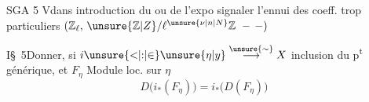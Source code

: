 \noindent SGA 5 \(\mathrm{V}\)\quad dans introduction du  ou de l'expo signaler l'ennui des coeff. trop particuliers \((\mathbb{Z}_{\ell},\,\unsure{\mathbb{Z}|Z}/\ell^{\unsure{\nu|n|N}}\mathbb{Z}\ -\,-)\)


\noindent \(\mathrm{I}\)\quad \S\ 5\qquad Donner, si \(i\unsure{{<}|{:}|{\in}}\unsure{\eta|y}\overset{\unsure{\sim}}{\longrightarrow} X\) inclusion du p\textsuperscript{t} générique, et \(F_{\eta}\) Module loc.  sur \(\eta\)
\[
 D\bigl(i_{*}(F_{\eta})\bigr)=i_{*}\bigl(D(F_{\eta})\bigr)
\]
\clearpage

